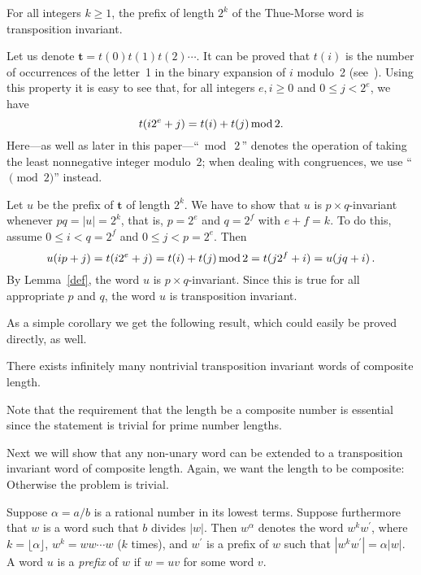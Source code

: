 \documentclass{elsart}
\newcommand{\thue}{\mathbf{t}}
\newcommand{\congmod }[1]{\!\!\pmod #1}
\begin{document}
\begin{prop}
For all integers $k\geq 1$, the prefix of length $2^k$ of the Thue-Morse
word  is transposition invariant.
\end{prop}
\begin{pf}
Let us denote $\thue=t(0) t(1) t(2) \cdots$. It can be proved that $t(i)$
is the number of occurrences of the letter~1 in the binary expansion of $i$  modulo~2  (see~\cite{Lot}). Using this
property it is easy to see that, for all integers $e,i \geq 0$ and $ 0 \leq j < 2^e$, we have
\[
t(i 2^e + j) = t(i)+t(j) \mbox{\,mod\,} 2.
\]
Here---as well as later in this paper---\mbox{``$\bmod\ 2\,$''} denotes the operation of taking the least nonnegative integer modulo~2;
when dealing with congruences, we use \mbox{``$\congmod 2$''} instead.

Let $u$ be the prefix of $\thue$ of length $2^k$. We have to show that $u$ is
$p\times q$-invariant whenever $pq=|u|=2^k$, that is,  $p=2^e$ and $
q=2^f$ with $e+f=k$. To do this, assume $0 \leq i <  q=2^f$ and $0 \leq j <  p=2^e$. Then
$$
u(ip+j)=t(i 2^e+j) = t(i)+t(j) \mbox{\,mod\,} 2 =  t(j 2^f+i)=u(jq+i)\,.
$$
By Lemma~\ref{def}, the word $u$ is $p\times q$-invariant. Since this
is true for all appropriate $p$ and $q$, the word $u$ is  transposition invariant.
\end{pf}


As a simple corollary we get the following result, which could easily be proved directly, as well.

\begin{cor}
There exists infinitely many nontrivial transposition invariant words of composite length.
\end{cor}

Note that the requirement that  the length be a composite number is essential since the statement is trivial for prime number lengths.

Next we will show that any non-unary word can be extended to a transposition invariant word of composite length. Again, we want the length to be composite: Otherwise the problem is trivial.

Suppose $\alpha=a/b$ is a rational number in its lowest terms. Suppose furthermore that $w$ is a word such that $b$ divides $|w|$.
Then $w^\alpha$ denotes the word $w^k w^{\prime}$, where $k=\lfloor \alpha \rfloor$,  $w^k = w w \cdots w$
($k$ times), and $w^\prime$ is a prefix of $w$ such that $|w^k w^{\prime}| = \alpha |w|$. A word $u$ is a \emph{prefix} of $w$ if $w=uv$ for some word $v$.
\end{document}
